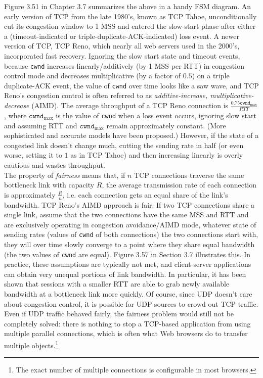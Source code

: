 \documentclass[8pt, table, xcdraw]{article}%
\begin{document}
\begin{itemize}
    Figure 3.51 in Chapter 3.7 summarizes the above in a handy FSM diagram. An early version of TCP from the late 1980's, known as TCP Tahoe, unconditionally cut its congestion window to 1 MSS and entered the slow-start phase after either a (timeout-indicated or triple-duplicate-ACK-indicated) loss event. A newer version of TCP, TCP Reno, which nearly all web servers used in the 2000's, incorporated fast recovery. Ignoring the slow start state and timeout events, because \lstinline{cwnd} increases linearly/additively (by 1 MSS per RTT) in congestion control mode and decreases multiplicative (by a factor of $0.5$) on a triple duplicate-ACK event, the value of \lstinline{cwnd} over time looks like a saw wave, and TCP Reno's congestion control is often referred to as \emph{additive-increase, multiplicative-decrease} (AIMD). The average throughput of a TCP Reno connection is $\frac{0.75 \mathtt{cwnd}_\text{max}}{RTT}$, where $\mathtt{cwnd}_\text{max}$ is the value of \lstinline{cwnd} when a loss event occurs, ignoring slow start and assuming RTT and $\mathtt{cwnd}_\text{max}$ remain approximately constant. (More sophisticated and accurate models have been proposed.) However, if the state of a congested link doesn't change much, cutting the sending rate in half (or even worse, setting it to $1$ as in TCP Tahoe) and then increasing linearly is overly cautious and wastes throughput.\\
    The property of \emph{fairness} means that, if $n$ TCP connections traverse the same bottleneck link with capacity $R$, the average transmission rate of each connection is approximately $\frac{R}{n}$, i.e. each connection gets an equal share of the link's bandwidth. TCP Reno's AIMD approach is fair. If two TCP connections share a single link, assume that the two connections have the same MSS and RTT and are exclusively operating in congestion avoidance/AIMD mode, whatever state of sending rates (values of \lstinline{cwnd} of both connections) the two connections start with, they will over time slowly converge to a point where they share equal bandwidth (the two values of \lstinline{cwnd} are equal). Figure 3.57 in Section 3.7 illustrates this. In practice, these assumptions are typically not met, and client-server applications can obtain very unequal portions of link bandwidth. In particular, it has been shown that sessions with a smaller RTT are able to grab newly available bandwidth at a bottleneck link more quickly. Of course, since UDP doesn't care about congestion control, it is possible for UDP sources to crowd out TCP traffic. Even if UDP traffic behaved fairly, the fairness problem would still not be completely solved: there is nothing to stop a TCP-based application from using multiple parallel connections, which is often what Web browsers do to transfer multiple objects.\footnote{The exact number of multiple connections is configurable in most browsers.}\\

\end{itemize}
\end{document}
